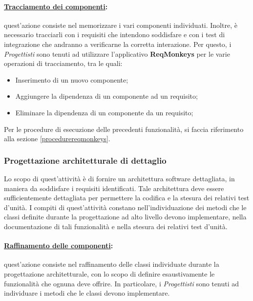 \paragraph{\underline{Tracciamento dei componenti}:} quest'azione consiste nel memorizzare i vari componenti individuati. Inoltre, è necessario tracciarli con i requisiti che intendono soddisfare e con i test di integrazione che andranno a verificarne la corretta interazione. Per questo, i \textit{Progettisti} sono tenuti ad utilizzare l'applicativo \textbf{ReqMonkeys} per le varie operazioni di tracciamento, tra le quali:
\begin{itemize}
\item Inserimento di un nuovo componente;
\item Aggiungere la dipendenza di un componente ad un requisito;
\item Eliminare la dipendenza di un componente da un requisito;
\end{itemize}
Per le procedure di esecuzione delle precedenti funzionalità, si faccia riferimento alla sezione \ref{procedurereqmonkeys}.



\subsubsection{Progettazione architetturale di dettaglio}
\label{progettazionedettaglio}
Lo scopo di quest'attività è di fornire un architettura software dettagliata, in maniera da soddisfare i requisiti identificati. Tale architettura deve essere sufficientemente dettagliata per permettere la codifica e la stesura dei relativi test d'unità. I compiti di quest'attività constano nell'individuazione dei metodi che le classi definite durante la progettazione ad alto livello devono implementare, nella documentazione di tali funzionalità e nella stesura dei relativi test d'unità.

\paragraph{\underline{Raffinamento delle componenti}:} quest'azione consiste nel raffinamento delle classi individuate durante la progettazione architetturale, con lo scopo di definire esaustivamente le funzionalità che ognuna deve offrire. In particolare, i \textit{Progettisti} sono tenuti ad individuare i metodi che le classi devono implementare.

